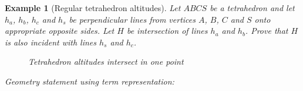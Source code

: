 \documentclass[final,1p,times,authoryear]{elsarticle}
\newtheorem{example}[theorem]{Example}
\begin{document}
\begin{example}[Regular tetrahedron altitudes] 
Let $ABCS$ be a tetrahedron and let $h_a$, $h_b$, $h_c$ and $h_s$ be
perpendicular lines from vertices $A$, $B$, $C$ and $S$ onto
appropriate opposite sides. Let $H$ be intersection of lines $h_a$ and
$h_b$. Prove that $H$ is also incident with lines $h_s$ and $h_c$.

\begin{figure}[!hb]
\begin{center}

\end{center}
\caption{Tetrahedron altitudes intersect in one point}
\end{figure}

Geometry statement using term representation:


\end{example}
\end{document}
